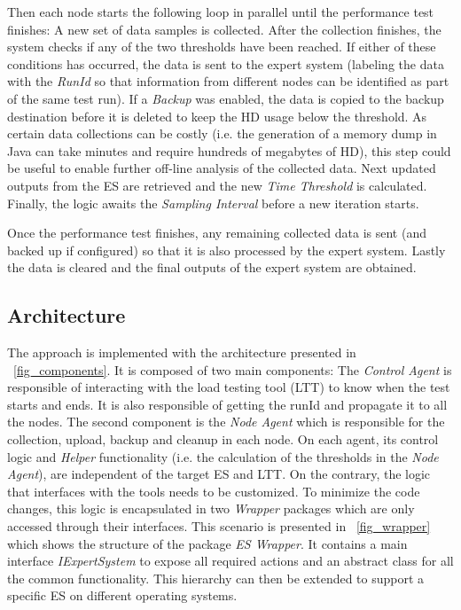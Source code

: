 \documentclass[runningheads,a4paper]{llncs}
\newcommand{\myspaceM}{-7.6pt}
\begin{document}
Then each node starts the following loop in parallel until the performance test
finishes: A new set of data samples is collected. After the collection finishes, the system checks if
any of the two thresholds have been reached. If either of these conditions has occurred, 
the data is sent to the expert system (labeling the data with the \emph{RunId}
so that information from different nodes can be identified as part of the same test run). 
If a \emph{Backup} was enabled, the data is copied to the backup destination before it is deleted to keep
the HD usage below the threshold. As certain data collections can be costly (i.e. 
the generation of a memory dump in Java can take minutes and require
hundreds of megabytes of HD), this step could be useful to enable further
off-line analysis of the collected data. Next updated outputs from the ES are
retrieved and the new \emph{Time Threshold} is calculated. Finally, the logic
awaits the \emph{Sampling Interval} before a new iteration starts.

Once the performance test finishes, any remaining collected data is sent (and
backed up if configured) so that it is also processed by the
expert system. Lastly the data is cleared and the final outputs of the expert system are obtained.

\vspace{\myspaceM{}}
\subsection{Architecture}
\vspace{\myspaceM{}}
The approach is implemented with the architecture
presented in \figurename ~\ref{fig_components}. It is composed of two main components:
The \emph{Control Agent} is responsible of interacting with the load
testing tool (LTT) to know when the test starts and ends. It is also responsible
of getting the runId and propagate it to all the nodes. The second component is
the \emph{Node Agent} which is responsible for the collection, upload, backup and cleanup 
in each node. On each agent, its control logic and \emph{Helper}
functionality (i.e. the calculation of the thresholds in the \emph{Node Agent}),
are independent of the target ES and LTT. On the contrary, the logic that interfaces 
with the tools needs to be customized. To minimize the code changes, this logic
is encapsulated in two \emph{Wrapper} packages which are only accessed through
their interfaces. This scenario is presented in \figurename ~\ref{fig_wrapper}
which shows the structure of the package \emph{ES Wrapper}. It contains a main interface
\emph{IExpertSystem} to expose all required actions and an abstract
class for all the common functionality. This hierarchy can then be extended to
support a specific ES on different operating systems.
\end{document}

